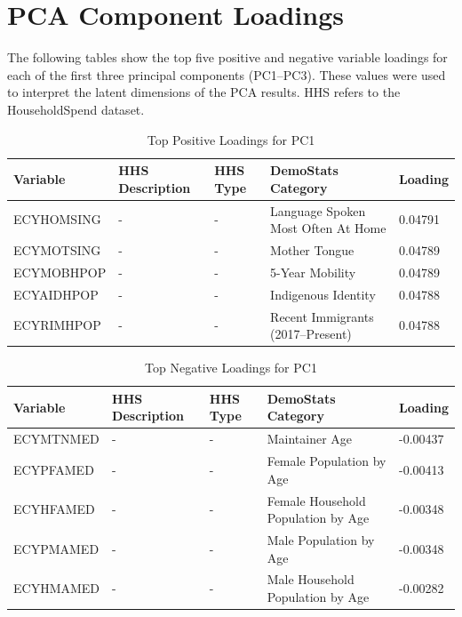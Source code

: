 \documentclass{article}
\begin{document}
\section{PCA Component Loadings}

The following tables show the top five positive and negative variable loadings for each of the first three principal components (PC1–PC3). These values were used to interpret the latent dimensions of the PCA results. HHS refers to the HouseholdSpend dataset.

\begin{table}[H]
\centering
\caption{Top Positive Loadings for PC1}
\label{tab:pc1_pos}
\begin{tabular}{@{}lllll@{}}
\toprule
Variable & HHS Description & HHS Type & DemoStats Category & Loading \\
\midrule
ECYHOMSING & - & - & Language Spoken Most Often At Home & 0.04791 \\
ECYMOTSING & - & - & Mother Tongue & 0.04789 \\
ECYMOBHPOP & - & - & 5-Year Mobility & 0.04789 \\
ECYAIDHPOP & - & - & Indigenous Identity & 0.04788 \\
ECYRIMHPOP & - & - & Recent Immigrants (2017–Present) & 0.04788 \\
\bottomrule
\end{tabular}
\end{table}

\begin{table}[H]
\centering
\caption{Top Negative Loadings for PC1}
\label{tab:pc1_neg}
\begin{tabular}{@{}lllll@{}}
\toprule
Variable & HHS Description & HHS Type & DemoStats Category & Loading \\
\midrule
ECYMTNMED & - & - & Maintainer Age & -0.00437 \\
ECYPFAMED & - & - & Female Population by Age & -0.00413 \\
ECYHFAMED & - & - & Female Household Population by Age & -0.00348 \\
ECYPMAMED & - & - & Male Population by Age & -0.00348 \\
ECYHMAMED & - & - & Male Household Population by Age & -0.00282 \\
\bottomrule
\end{tabular}
\end{table}
\end{document}
